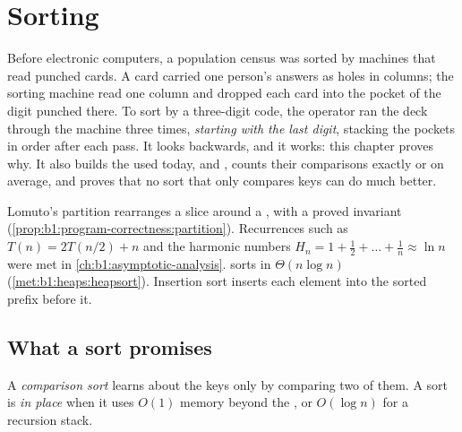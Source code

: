 \chapter{Sorting}\label{ch:b1:sorting}

Before electronic computers, a population census was sorted by machines that read punched cards. A card carried one
person's answers as holes in columns; the sorting machine read one column and dropped each card into the pocket of the
digit punched there. To sort by a three-digit code, the operator ran the deck through the machine three times,
\emph{starting with the last digit}, stacking the pockets in order after each pass. It looks backwards, and it works:
this chapter proves why. It also builds the  used today,  and , counts their
comparisons exactly or on average, and proves that no sort that only compares keys can do much better.

\begin{recall}
Lomuto's partition rearranges a slice around a , with a proved invariant
(\cref{prop:b1:program-correctness:partition}).
Recurrences such as $T(n) = 2T(n/2) + n$ and the harmonic numbers $H_n = 1 + \frac12 + \dots + \frac1n \approx \ln n$
were met in \cref{ch:b1:asymptotic-analysis}.  sorts  in $\Theta(n \log n)$ (\cref{met:b1:heaps:heapsort}).
Insertion sort inserts each element into the sorted prefix before it.
\end{recall}

\section{What a sort promises}\label{sec:b1:sorting:promises}

\begin{definition}\label{def:b1:sorting:comparison-sort}
A \emph{comparison sort} learns about the keys only by comparing two of them. A sort is
\emph{in place} when it uses $O(1)$ memory beyond the , or $O(\log n)$ for a recursion stack.
\end{definition}

